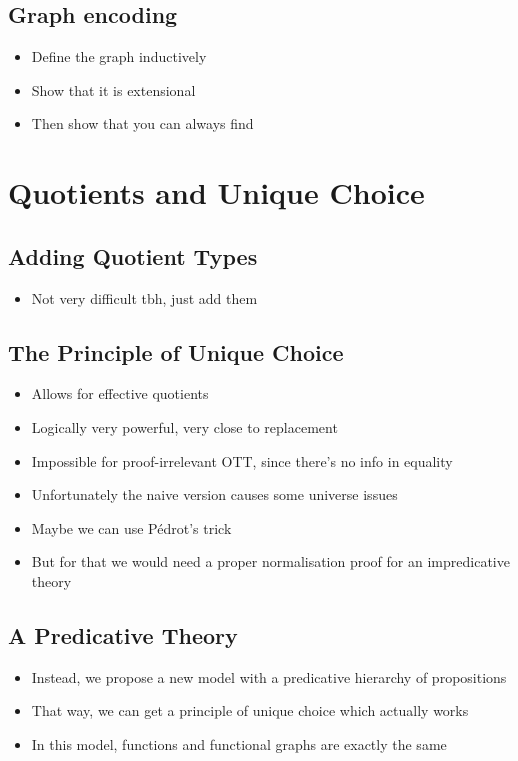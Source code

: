 \documentclass[acmsmall,screen,review]{acmart}
\begin{document}
\subsection{Graph encoding}

\begin{itemize}
\item Define the graph inductively
\item Show that it is extensional
\item Then show that you can always find
\end{itemize}

\section{Quotients and Unique Choice}

\subsection{Adding Quotient Types}

\begin{itemize}
\item Not very difficult tbh, just add them
\end{itemize}

\subsection{The Principle of Unique Choice}

\begin{itemize}
\item Allows for effective quotients
\item Logically very powerful, very close to replacement
\item Impossible for proof-irrelevant OTT, since there's no info in equality
\item Unfortunately the naive version causes some universe issues
\item Maybe we can use Pédrot's trick
\item But for that we would need a proper normalisation proof for an impredicative theory
\end{itemize}

\subsection{A Predicative Theory}

\begin{itemize}
\item Instead, we propose a new model with a predicative hierarchy of propositions
\item That way, we can get a principle of unique choice which actually works
\item In this model, functions and functional graphs are exactly the same
\end{itemize}
\end{document}
